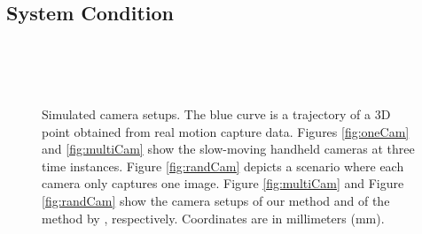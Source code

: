 \subsection{System Condition} \label{sec:system_condition}
\begin{figure}
\centering
{}\\
\\
\\
\caption[Illustration of three camera setups.]{Simulated camera setups. The blue curve is a trajectory of a 3D point obtained from real motion capture data. Figures \ref{fig:oneCam} and \ref{fig:multiCam} show the slow-moving handheld cameras at three time instances. Figure \ref{fig:randCam} depicts a scenario where each camera only captures one image.
Figure \ref{fig:multiCam} and Figure \ref{fig:randCam} show the camera setups of our method and of the method by \citet{zheng2014joint}, respectively. Coordinates are in millimeters (mm).
}
\label{fig:condition}
\end{figure}

